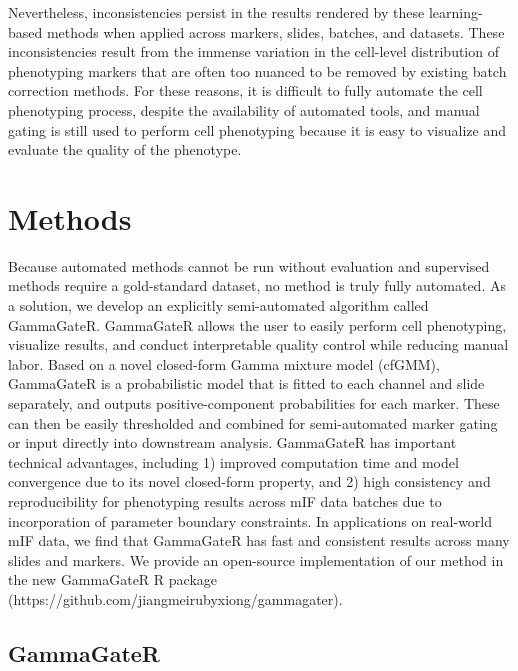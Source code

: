 \documentclass[
  letterpaper,
  DIV=11,
  numbers=noendperiod,
  oneside]{scrreprt}
\begin{document}
Nevertheless, inconsistencies persist in the results rendered by these
learning-based methods when applied across markers, slides, batches, and
datasets. These inconsistencies result from the immense variation in the
cell-level distribution of phenotyping markers that are often too
nuanced to be removed by existing batch correction methods. For these
reasons, it is difficult to fully automate the cell phenotyping process,
despite the availability of automated tools, and manual gating is still
used to perform cell phenotyping because it is easy to visualize and
evaluate the quality of the phenotype.

\hypertarget{methods}{%
\section{Methods}\label{methods}}

Because automated methods cannot be run without evaluation and
supervised methods require a gold-standard dataset, no method is truly
fully automated. As a solution, we develop an explicitly semi-automated
algorithm called GammaGateR. GammaGateR allows the user to easily
perform cell phenotyping, visualize results, and conduct interpretable
quality control while reducing manual labor. Based on a novel
closed-form Gamma mixture model (cfGMM), GammaGateR is a probabilistic
model that is fitted to each channel and slide separately, and outputs
positive-component probabilities for each marker. These can then be
easily thresholded and combined for semi-automated marker gating or
input directly into downstream analysis. GammaGateR has important
technical advantages, including 1) improved computation time and model
convergence due to its novel closed-form property, and 2) high
consistency and reproducibility for phenotyping results across mIF data
batches due to incorporation of parameter boundary constraints. In
applications on real-world mIF data, we find that GammaGateR has fast
and consistent results across many slides and markers. We provide an
open-source implementation of our method in the new GammaGateR R package
(https://github.com/jiangmeirubyxiong/gammagater).

\hypertarget{gammagater}{%
\subsection{GammaGateR}\label{gammagater}}
\end{document}
